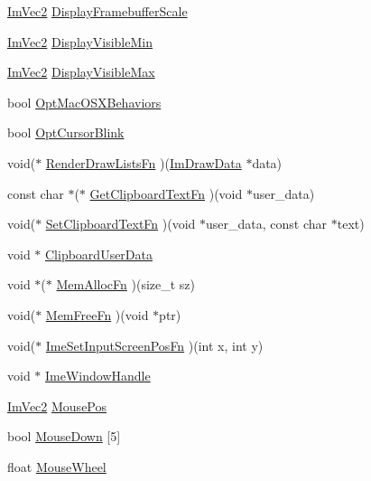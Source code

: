 \begin{DoxyCompactItemize}
\item 
\hyperlink{struct_im_vec2}{Im\+Vec2} \hyperlink{struct_im_gui_i_o_a703cad6bd4c9e8972d056116104d27e8}{Display\+Framebuffer\+Scale}
\item 
\hyperlink{struct_im_vec2}{Im\+Vec2} \hyperlink{struct_im_gui_i_o_a45b49309f2f8765622962ed7f286674d}{Display\+Visible\+Min}
\item 
\hyperlink{struct_im_vec2}{Im\+Vec2} \hyperlink{struct_im_gui_i_o_a9bb46e8da3da68b83c66219beb861cb1}{Display\+Visible\+Max}
\item 
bool \hyperlink{struct_im_gui_i_o_a99ffac55fc01f11166e8e92ca9ebda98}{Opt\+Mac\+O\+S\+X\+Behaviors}
\item 
bool \hyperlink{struct_im_gui_i_o_a676ccbf84e205effc5a023e8d5adc6eb}{Opt\+Cursor\+Blink}
\item 
void($\ast$ \hyperlink{struct_im_gui_i_o_ae16a9f25f36fe9706d8a33fb128e538a}{Render\+Draw\+Lists\+Fn} )(\hyperlink{struct_im_draw_data}{Im\+Draw\+Data} $\ast$data)
\item 
const char $\ast$($\ast$ \hyperlink{struct_im_gui_i_o_ab7face2b2efef720a22a7fb2143d415c}{Get\+Clipboard\+Text\+Fn} )(void $\ast$user\+\_\+data)
\item 
void($\ast$ \hyperlink{struct_im_gui_i_o_a1ee9c0763df33f7f3a9819235ce85078}{Set\+Clipboard\+Text\+Fn} )(void $\ast$user\+\_\+data, const char $\ast$text)
\item 
void $\ast$ \hyperlink{struct_im_gui_i_o_a162d9da988e8985df05d262640f2f91c}{Clipboard\+User\+Data}
\item 
void $\ast$($\ast$ \hyperlink{struct_im_gui_i_o_a352f6f0770974ee173f84d99d9e50a6e}{Mem\+Alloc\+Fn} )(size\+\_\+t sz)
\item 
void($\ast$ \hyperlink{struct_im_gui_i_o_adb56df4e96ab8a9f1aefe8dd474ba0f5}{Mem\+Free\+Fn} )(void $\ast$ptr)
\item 
void($\ast$ \hyperlink{struct_im_gui_i_o_ac59559342608fbdeb14778a4fd57c301}{Ime\+Set\+Input\+Screen\+Pos\+Fn} )(int x, int y)
\item 
void $\ast$ \hyperlink{struct_im_gui_i_o_a8baa252c4f76764eb866b920f227cfa2}{Ime\+Window\+Handle}
\item 
\hyperlink{struct_im_vec2}{Im\+Vec2} \hyperlink{struct_im_gui_i_o_ad2e9e547cb4d2abe8e7d27407efffeb8}{Mouse\+Pos}
\item 
bool \hyperlink{struct_im_gui_i_o_a8f4613baafc93026175d9cdaf4e82d21}{Mouse\+Down} \mbox{[}5\mbox{]}
\item 
float \hyperlink{struct_im_gui_i_o_a21d3ca4928989a2c838b7b4ea95e5824}{Mouse\+Wheel}

\end{DoxyCompactItemize}
